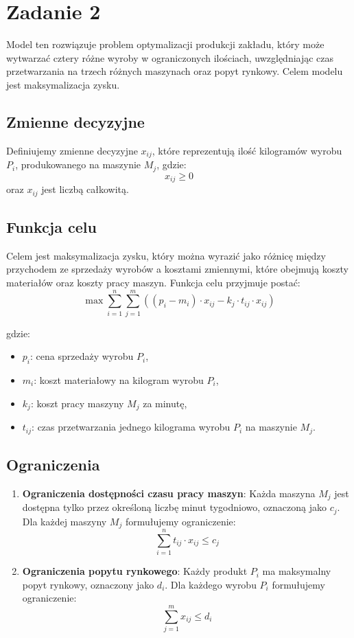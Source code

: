 \documentclass[12pt, letterpaper]{article}
\begin{document}
\section{Zadanie 2}

Model ten rozwiązuje problem optymalizacji produkcji zakładu, który może
wytwarzać cztery różne wyroby w ograniczonych ilościach, uwzględniając czas
przetwarzania na trzech różnych maszynach oraz popyt rynkowy. Celem modelu jest
maksymalizacja zysku.

\subsection*{Zmienne decyzyjne}
Definiujemy zmienne decyzyjne \( x_{ij} \), które reprezentują ilość kilogramów
wyrobu \( P_i \), produkowanego na maszynie \( M_j \), gdzie:
\[
  x_{ij} \geq 0
\]
oraz \( x_{ij} \) jest liczbą całkowitą.

\subsection*{Funkcja celu}
Celem jest maksymalizacja zysku, który można wyrazić jako różnicę między
przychodem ze sprzedaży wyrobów a kosztami zmiennymi, które obejmują koszty
materiałów oraz koszty pracy maszyn. Funkcja celu przyjmuje postać:
\[
  \max \sum_{i=1}^n \sum_{j=1}^m \left( \left( p_i - m_i \right) \cdot	x_{ij}
  - k_j \cdot t_{ij} \cdot x_{ij} \right)
\]

gdzie:
\begin{itemize}
  \item \( p_i \): cena sprzedaży wyrobu \( P_i \),
  \item \( m_i \): koszt materiałowy na kilogram wyrobu \( P_i \),
  \item \( k_j \): koszt pracy maszyny \( M_j \) za minutę,
  \item \( t_{ij} \): czas przetwarzania jednego kilograma wyrobu \( P_i \) na
        maszynie \( M_j \).
\end{itemize}

\subsection*{Ograniczenia}
\begin{enumerate}
  \item \textbf{Ograniczenia dostępności czasu pracy maszyn}: Każda maszyna \(
        M_j \) jest dostępna tylko przez określoną liczbę minut tygodniowo,
        oznaczoną
        jako \( c_j \). Dla każdej maszyny \( M_j \) formułujemy ograniczenie:
        \[
          \sum_{i=1}^n t_{ij} \cdot x_{ij} \leq c_j
        \]

  \item \textbf{Ograniczenia popytu rynkowego}: Każdy produkt \( P_i \) ma
        maksymalny popyt rynkowy, oznaczony jako \( d_i \). Dla każdego wyrobu
        \( P_i
        \) formułujemy ograniczenie:
        \[
          \sum_{j=1}^m x_{ij} \leq d_i
        \]
\end{enumerate}
\end{document}
